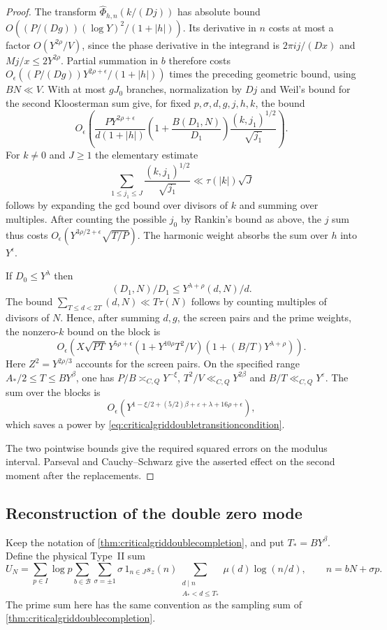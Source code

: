 \documentclass[11pt,a4paper]{article}
\numberwithin{equation}{section}
\begin{document}
\begin{proof}
The transform $\widehat\Phi_{h,n}(k/(Dj))$ has absolute
bound $O((P/(Dg))(\log Y)^2/(1+|h|))$.
Its derivative in $n$ costs at most a factor
$O(Y^{2\rho}/V)$, since the phase derivative in the
integrand is $2\pi i j/(D x)$ and $Mj/x\le2Y^{2\rho}$.
Partial summation in $b$ therefore costs
$O_\epsilon((P/(Dg))Y^{2\rho+\epsilon}/(1+|h|))$
times the preceding geometric bound, using $BN\ll V$.
With at most $gJ_0$ branches, normalization by $Dj$
and Weil's bound for the second Kloosterman sum give,
for fixed $p,\sigma,d,g,j,h,k$, the bound
\[
 O_\epsilon\!\left(
 \frac{P Y^{2\rho+\epsilon}}{d(1+|h|)}
       \left(1+\frac{B(D_1,N)}{D_1}\right)
                     \frac{(k,j_1)^{1/2}}{\sqrt{j_1}}
 \right).
\]
For $k\ne0$ and $J\ge1$ the elementary estimate
\[
 \sum_{1\le j_1\le J}\frac{(k,j_1)^{1/2}}{\sqrt{j_1}}
       \ll \tau(|k|)\sqrt J
\]
follows by expanding the gcd bound over divisors of
$k$ and summing over multiples. After counting the
possible $j_0$ by Rankin's bound as above, the $j$ sum
thus costs $O_\epsilon(Y^{3\rho/2+\epsilon}\sqrt{T/P})$.
The harmonic weight absorbs the sum over $h$ into
$Y^\epsilon$.

If $D_0\le Y^\lambda$ then
\[
 (D_1,N)/D_1 \le Y^{\lambda+\rho}(d,N)/d .
\]
The bound $\sum_{T\le d<2T}(d,N)\ll T\tau(N)$
follows by counting multiples of divisors of $N$.
Hence, after summing $d,g$, the screen pairs and the
prime weights, the nonzero-$k$ bound on the block is
\[
 O_\epsilon\!\left(
 X\sqrt{PT}\,Y^{5\rho+\epsilon}
       (1+Y^{10\rho}T^2/V)
       (1+(B/T)Y^{\lambda+\rho})\right).
\]
Here $Z^2=Y^{2\rho/3}$ accounts for the screen pairs.
On the specified range
$A_*/2\le T\le B Y^\beta$, one has
$P/B\asymp_{C,Q}Y^{-\xi}$, $T^2/V\ll_{C,Q}Y^{2\beta}$
and $B/T\ll_{C,Q}Y^\varepsilon$.
The sum over the blocks is
\[
 O_\epsilon\!\left(
        Y^{1-\xi/2+(5/2)\beta+\varepsilon+\lambda+16\rho+\epsilon}\right),
\]
which saves a power by \cref{eq:criticalgriddoubletransitioncondition}.

The two pointwise bounds give the required squared
errors on the modulus interval. Parseval and
Cauchy--Schwarz give the asserted effect on the second
moment after the replacements.
\end{proof}

\clearpage
\subsection{Reconstruction of the double zero mode}

Keep the notation of \cref{thm:criticalgriddoublecompletion},
and put $T_*=B Y^\beta$. Define the physical Type~II sum
\begin{equation}
 U_N=\sum_{p\in I}\log p\sum_{b\in\mathcal B}
       \sum_{\sigma=\pm1}\sigma\,1_{n\in J}s_z(n)
       \sum_{\substack{d\mid n\\A_*<d\le T_*}}
                    \mu(d)\log(n/d),
 \qquad n=bN+\sigma p.
 \label{eq:criticalgridtransitionphysical}
\end{equation}
The prime sum here has the same convention as the
sampling sum of \cref{thm:criticalgriddoublecompletion}.
\end{document}
